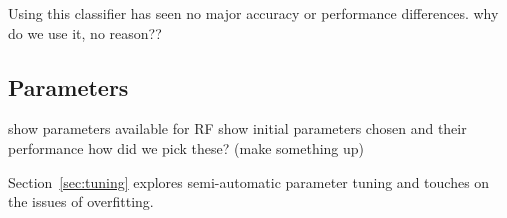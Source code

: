 Using this classifier has seen no major accuracy or performance differences.
why do we use it, no reason??

\subsection{Parameters}
show parameters available for RF
show initial parameters chosen and their performance
how did we pick these? (make something up)

Section~\ref{sec:tuning} explores semi-automatic parameter tuning and touches on
the issues of overfitting.
